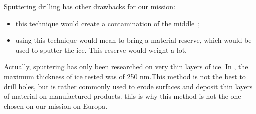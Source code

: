\noindent
Sputtering drilling has other drawbacks for our mission:
\begin{itemize}
\item{this technique would create a contamination of the middle~;}
\item{using this technique would mean to bring a material reserve, which would be used to sputter the ice. This reserve would weight a lot.}
\end{itemize}
Actually, sputtering has only been researched on very thin layers of ice. In \cite{baragiola2003sputtering}, the maximum thickness of ice tested was of 250 nm.This method is not the best to drill holes, but is rather commonly used to erode surfaces and deposit thin layers of material on manufactured products. this is why this method is not the one chosen on our mission on Europa.
